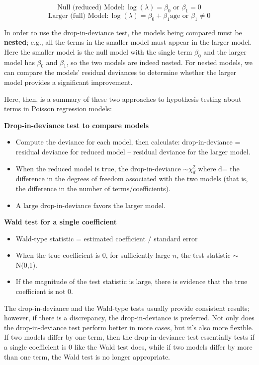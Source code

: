 \documentclass[
]{krantz}
\providecommand{\tightlist}{%
  \setlength{\itemsep}{0pt}\setlength{\parskip}{0pt}}
\begin{document}
\[\textrm{Null (reduced) Model}: \log(\lambda) = \beta_0 \textrm{ or } \beta_1=0\]
\[\textrm{Larger (full) Model}: \log(\lambda) = \beta_0 + \beta_1\textrm{age} \textrm{ or } \beta_1 \neq 0 \]

In order to use the drop-in-deviance test, the models being compared must be \textbf{nested};  e.g., all the terms in the smaller model must appear in the larger model. Here the smaller model is the null model with the single term \(\beta_0\) and the larger model has \(\beta_0\) and \(\beta_1\), so the two models are indeed nested. For nested models, we can compare the models' residual deviances to determine whether the larger model provides a significant improvement.

Here, then, is a summary of these two approaches to hypothesis testing about terms in Poisson regression models:

\textbf{Drop-in-deviance test to compare models} 

\begin{itemize}
\tightlist
\item
  Compute the deviance for each model, then calculate: drop-in-deviance = residual deviance for reduced model -- residual deviance for the larger model.
\item
  When the reduced model is true, the drop-in-deviance \(\sim \chi^2_d\)
  where d= the difference in the degrees of freedom associated with the two models (that is, the difference in the number of terms/coefficients).
\item
  A large drop-in-deviance favors the larger model.
\end{itemize}

\textbf{Wald test for a single coefficient} 

\begin{itemize}
\tightlist
\item
  Wald-type statistic = estimated coefficient / standard error
\item
  When the true coefficient is 0, for sufficiently large \(n\), the test statistic \(\sim\) N(0,1).
\item
  If the magnitude of the test statistic is large, there is evidence that the true coefficient is not 0.
\end{itemize}

The drop-in-deviance and the Wald-type tests usually provide consistent results; however, if there is a discrepancy, the drop-in-deviance is preferred. Not only does the drop-in-deviance test perform better in more cases, but it's also more flexible. If two models differ by one term, then the drop-in-deviance test essentially tests if a single coefficient is 0 like the Wald test does, while if two models differ by more than one term, the Wald test is no longer appropriate.
\end{document}
